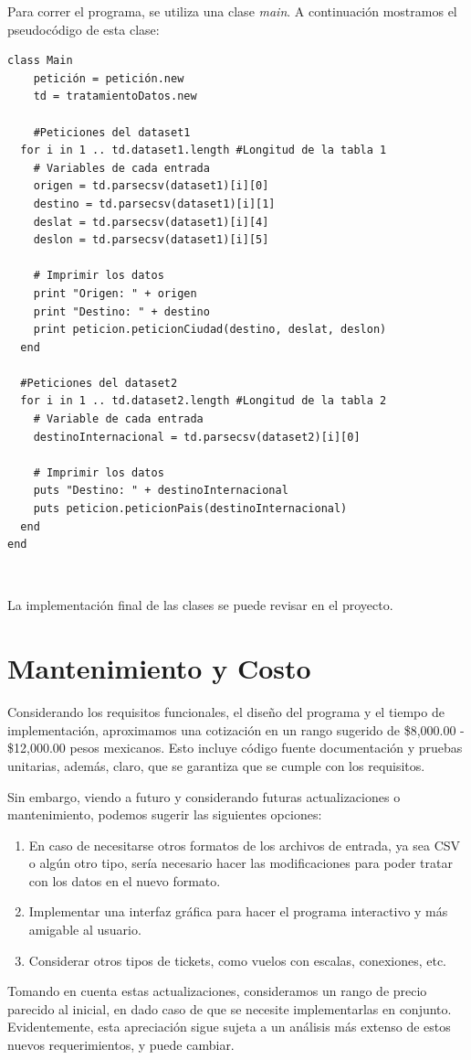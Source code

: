 \documentclass[11 pt]{article}
\theoremstyle{remark}
\begin{document}
		Para correr el programa, se utiliza una clase \emph{main}. A continuación mostramos el pseudocódigo de esta clase:

		\begin{lstlisting}[caption={Pseudocódigo de la clase \emph{main}}]
class Main
	petición = petición.new
	td = tratamientoDatos.new

	#Peticiones del dataset1
  for i in 1 .. td.dataset1.length #Longitud de la tabla 1
  	# Variables de cada entrada
    origen = td.parsecsv(dataset1)[i][0]
    destino = td.parsecsv(dataset1)[i][1]
    deslat = td.parsecsv(dataset1)[i][4]
    deslon = td.parsecsv(dataset1)[i][5]

    # Imprimir los datos
    print "Origen: " + origen
    print "Destino: " + destino
    print peticion.peticionCiudad(destino, deslat, deslon)
  end

  #Peticiones del dataset2
  for i in 1 .. td.dataset2.length #Longitud de la tabla 2
  	# Variable de cada entrada
  	destinoInternacional = td.parsecsv(dataset2)[i][0]

  	# Imprimir los datos
    puts "Destino: " + destinoInternacional
    puts peticion.peticionPais(destinoInternacional)
  end
end\end{lstlisting}

		~
		
		La implementación final de las clases se puede revisar en el proyecto.
		
		
\section{Mantenimiento y Costo}

	Considerando los requisitos funcionales, el diseño del programa y el tiempo de implementación, aproximamos una cotización en un rango sugerido de \$8,000.00 - \$12,000.00 pesos mexicanos. Esto incluye código fuente documentación y pruebas unitarias, además, claro, que se garantiza que se cumple con los requisitos.
	
	Sin embargo, viendo a futuro y considerando futuras actualizaciones o mantenimiento, podemos sugerir las siguientes opciones:
	
	\begin{enumerate}
		\item En caso de necesitarse otros formatos de los archivos de entrada, ya sea CSV o algún otro tipo, sería necesario hacer las modificaciones para poder tratar con los datos en el nuevo formato.
		
		\item Implementar una interfaz gráfica para hacer el programa interactivo y más amigable al usuario.
		
		\item Considerar otros tipos de tickets, como vuelos con escalas, conexiones, etc.

	\end{enumerate}

	Tomando en cuenta estas actualizaciones, consideramos un rango de precio parecido al inicial, en dado caso de que se necesite implementarlas en conjunto. Evidentemente, esta apreciación sigue sujeta a un análisis más extenso de estos nuevos requerimientos, y puede cambiar.
	
	
\end{document}
